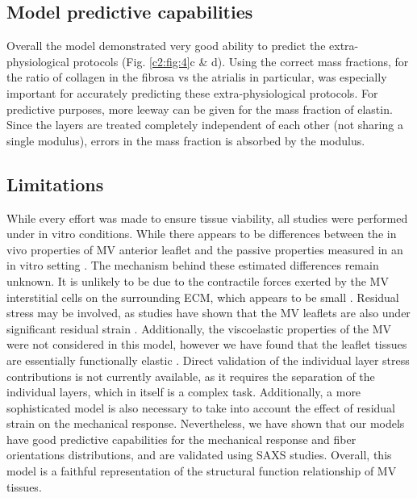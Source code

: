    
\subsection{Model predictive capabilities}

    Overall the model demonstrated very good ability to predict the extra-physiological protocols (Fig. \ref{c2:fig:4}c \& d). Using the correct mass fractions, for the ratio of collagen in the fibrosa vs the atrialis in particular, was especially important for accurately predicting these extra-physiological protocols. For predictive purposes, more leeway can be given for the mass fraction of elastin. Since the layers are treated completely independent of each other (not sharing a single modulus), errors in the mass fraction is absorbed by the modulus.
    
    
    
    
\subsection{Limitations}

    While every effort was made to ensure tissue viability, all studies were performed under in vitro conditions. While there appears to be differences between the in vivo properties of MV anterior leaflet \cite{krishnamurthy_material_2008} and the passive properties measured in an in vitro setting \cite{grashow_planar_2006}\cite{may-newman_biaxial_1995}. The mechanism behind these estimated differences remain unknown. It is unlikely to be due to the contractile forces exerted by the MV interstitial cells on the surrounding ECM, which appears to be small \cite{buchanan_interlayer_2013}. Residual stress may be involved, as studies have shown that the MV leaflets are also under significant residual strain \cite{amini_vivo_2012}. Additionally, the viscoelastic properties of the MV were not considered in this model, however we have found that the leaflet tissues are essentially functionally elastic \cite{grashow_biaxial_2006}\cite{grashow_planar_2006}. Direct validation of the individual layer stress contributions is not currently available, as it requires the separation of the individual layers, which in itself is a complex task. Additionally, a more sophisticated model is also necessary to take into account the effect of residual strain on the mechanical response. Nevertheless, we have shown that our models have good predictive capabilities for the mechanical response and fiber orientations distributions, and are validated using SAXS studies. Overall, this model is a faithful representation of the structural function relationship of MV tissues.